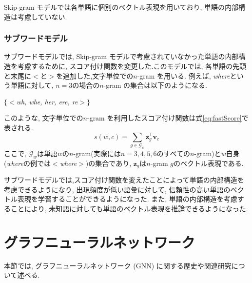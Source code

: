 \documentclass[a4j,twoside,12pt,dvipdfmx]{thesis} %
\begin{document}
\par Skip-gram モデルでは各単語に個別のベクトル表現を用いており, 単語の内部構造は考慮していない.

\subsubsection*{サブワードモデル}
サブワードモデルでは, Skip-gram モデルで考慮されていなかった単語の内部構造を考慮するために, スコア付け関数を変更した.このモデルでは, 各単語の先頭と末尾に$<$と$>$を追加した,文字単位での$n$-gram を用いる. 例えば, \textsl{where}という単語に対して, $n=3$の場合の$n$-gram の集合は以下のようになる.
\centerline{$\{<$\textsl{wh, whe, her, ere, re}$>\}$}
このような, 文字単位での$n$-gram を利用したスコア付け関数は式\ref{eq:fastScore}で表される.
\begin{equation}
  \label{eq:fastScore}
  s(w,c) = \sum_{g\in \mathcal{G}_{w}} \mathbf{z}_{g}^\mathsf{T}\mathbf{v}_{c}
\end{equation}
ここで, $\mathcal{G}_{w}$は単語$w$の$n$-gram(実際には$n=3,4,5,6$のすべての$n$-gram)と$w$自身(\textsl{where}の例では$<$\textsl{where}$>$)の集合であり, $\mathbf{z}_{g}$は$n$-gram $g$のベクトル表現である.
\par サブワードモデルでは,スコア付け関数を変えたことによって単語の内部構造を考慮できるようになり, 出現頻度が低い語彙に対して, 信頼性の高い単語のベクトル表現を学習することができるようになった.
また, 単語の内部構造を考慮することにより, 未知語に対しても単語のベクトル表現を推論できるようになった.


\section{グラフニューラルネットワーク}\label{rel:GNN}
本節では, グラフニューラルネットワーク (GNN) に関する歴史や関連研究について述べる.
\end{document}
